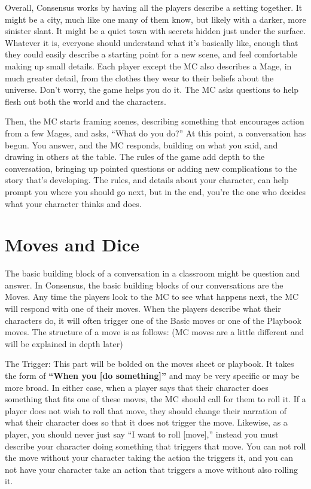 \documentclass[
]{memoir}
\begin{document}
Overall, Consensus works by having all the players describe a setting
together. It might be a city, much like one many of them know, but
likely with a darker, more sinister slant. It might be a quiet town with
secrets hidden just under the surface. Whatever it is, everyone should
understand what it's basically like, enough that they could easily
describe a starting point for a new scene, and feel comfortable making
up small details. Each player except the MC also describes a Mage, in
much greater detail, from the clothes they wear to their beliefs about
the universe. Don't worry, the game helps you do it. The MC asks
questions to help flesh out both the world and the characters.

Then, the MC starts framing scenes, describing something that encourages
action from a few Mages, and asks, ``What do you do?'' At this point, a
conversation has begun. You answer, and the MC responds, building on
what you said, and drawing in others at the table. The rules of the game
add depth to the conversation, bringing up pointed questions or adding
new complications to the story that's developing. The rules, and details
about your character, can help prompt you where you should go next, but
in the end, you're the one who decides what your character thinks and
does.

\hypertarget{moves-and-dice}{%
\section{Moves and Dice}\label{moves-and-dice}}

The basic building block of a conversation in a classroom might be
question and answer. In Consensus, the basic building blocks of our
conversations are the Moves. Any time the players look to the MC to see
what happens next, the MC will respond with one of their moves. When the
players describe what their characters do, it will often trigger one of
the Basic moves or one of the Playbook moves. The structure of a move is
as follows: (MC moves are a little different and will be explained in
depth later)

The Trigger: This part will be bolded on the moves sheet or playbook. It
takes the form of \textbf{``When you {[}do something{]}''} and may be
very specific or may be more broad. In either case, when a player says
that their character does something that fits one of these moves, the MC
should call for them to roll it. If a player does not wish to roll that
move, they should change their narration of what their character does so
that it does not trigger the move. Likewise, as a player, you should
never just say ``I want to roll {[}move{]},'' instead you must describe
your character doing something that triggers that move. You can not roll
the move without your character taking the action the triggers it, and
you can not have your character take an action that triggers a move
without also rolling it.
\end{document}
